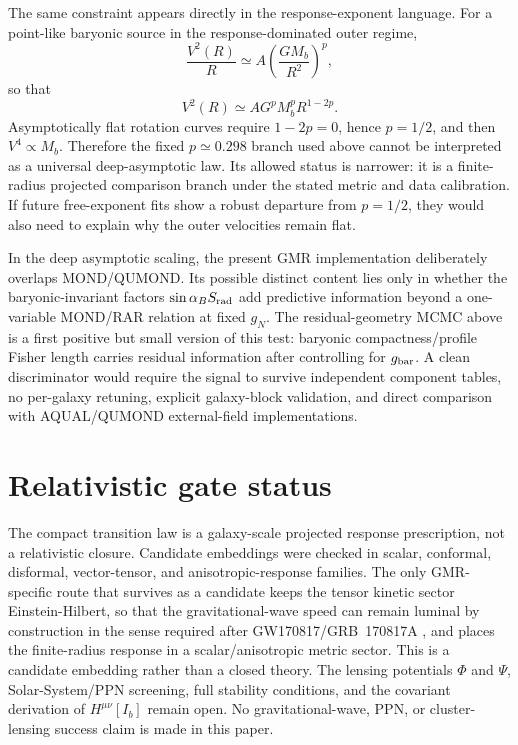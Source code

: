 ﻿\documentclass[twocolumn]{aastex631}
\begin{document}
The same constraint appears directly in the response-exponent language.  For a point-like baryonic source in the response-dominated outer regime,
\begin{equation}
 \frac{V^2(R)}{R}\simeq A\left(\frac{GM_b}{R^2}\right)^p ,
\end{equation}
so that
\begin{equation}
 V^2(R)\simeq A G^p M_b^p R^{1-2p}.
\end{equation}
Asymptotically flat rotation curves require $1-2p=0$, hence $p=1/2$, and then $V^4\propto M_b$.  Therefore the fixed $p\simeq0.298$ branch used above cannot be interpreted as a universal deep-asymptotic law.  Its allowed status is narrower: it is a finite-radius projected comparison branch under the stated metric and data calibration.  If future free-exponent fits show a robust departure from $p=1/2$, they would also need to explain why the outer velocities remain flat.

In the deep asymptotic scaling, the present GMR implementation deliberately overlaps MOND/QUMOND.  Its possible distinct content lies only in whether the baryonic-invariant factors $\sin\alpha_BS_{\rm rad}$ add predictive information beyond a one-variable MOND/RAR relation at fixed $g_N$.  The residual-geometry MCMC above is a first positive but small version of this test: baryonic compactness/profile Fisher length carries residual information after controlling for $g_{\rm bar}$.  A clean discriminator would require the signal to survive independent component tables, no per-galaxy retuning, explicit galaxy-block validation, and direct comparison with AQUAL/QUMOND external-field implementations.

\section{Relativistic gate status}
\label{sec:relativistic-gate-status}

The compact transition law is a galaxy-scale projected response prescription, not a relativistic closure.  Candidate embeddings were checked in scalar, conformal, disformal, vector-tensor, and anisotropic-response families.  The only GMR-specific route that survives as a candidate keeps the tensor kinetic sector Einstein-Hilbert, so that the gravitational-wave speed can remain luminal by construction in the sense required after GW170817/GRB~170817A \citep{Abbott2017GW170817,Abbott2017MultiMessenger,CreminelliVernizzi2017,EzquiagaZumalacarregui2017}, and places the finite-radius response in a scalar/an\-isotropic metric sector.  This is a candidate embedding rather than a closed theory.  The lensing potentials $\Phi$ and $\Psi$, Solar-System/PPN screening, full stability conditions, and the covariant derivation of $H^{\mu\nu}[I_b]$ remain open.  No gravitational-wave, PPN, or cluster-lensing success claim is made in this paper.
\end{document}
